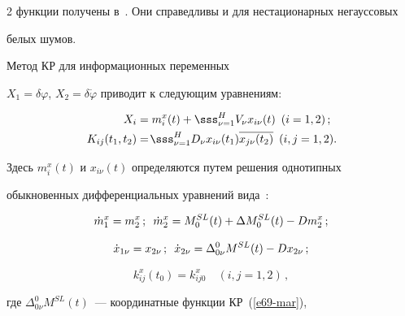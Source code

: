 \begin{multicols}{2}
функции получены в~\cite{15-mar}. Они справедливы и для нестационарных негауссовых 


белых шумов.





Метод КР для информационных переменных  


$X_1 =\delta \varphi$, $X_2 =\delta\dot\varphi$ приводит к следующим уравнениям:


 \begin{align}


 X_i &= m_i^x (t) +\sss_{\nu=1}^H V_\nu x_{i\nu}(t) \enskip ( i=1,2)\,;\label{e77-mar}\\


K_{ij}(t_1, t_2) &= \!\sss_{\nu=1}^H D_\nu x_{i\nu} (t_1) \overline{x_{j\nu}(t_2)}\enskip (i,j=1,2).\!


\label{e78-mar}


\end{align}


Здесь $m_i^x(t)$ и $x_{i\nu}(t)$ определяются путем решения однотипных 


обыкновенных дифференциальных уравнений вида~\cite{17-mar}:


    \begin{equation*}


    \dot m_1^x = m_2^x\,;\enskip 


    \dot m_2^x = M^{SL}_0 (t) +\Delta M_0^{SL} (t) - D m_2^x\,; %


    \end{equation*}





\noindent


\begin{equation*}


\dot x_{1\nu}= x_{2\nu}\,;\enskip \dot x_{2\nu} =\Delta_{0\nu}^0 M^{SL} (t) - D x_{2\nu}\,;


\end{equation*}





\noindent


\begin{equation*}


k_{ij}^x (t_0) = k_{ij0}^x \quad (i,j=1,2)\,, %


    \end{equation*}


где $\Delta_{0\nu}^0 M^{SL}(t)$~--- координатные функции КР~(\ref{e69-mar}), 



\end{multicols}
